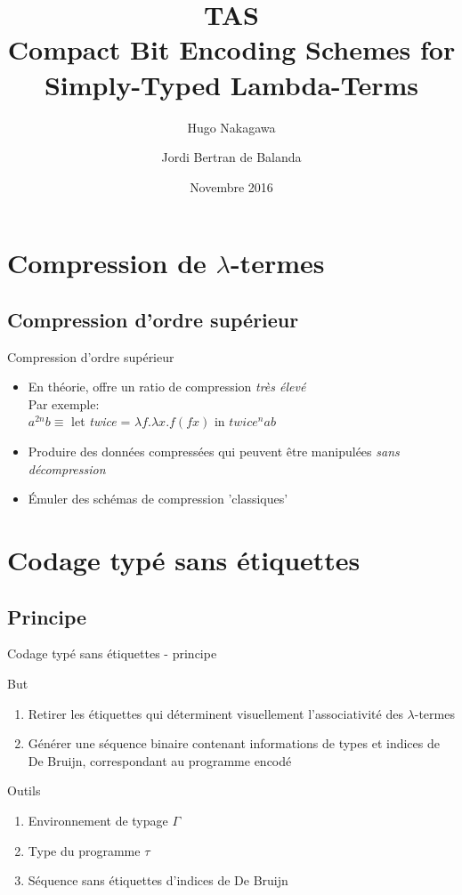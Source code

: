 \documentclass{beamer}
\title{TAS \\ Compact Bit Encoding Schemes for Simply-Typed Lambda-Terms}
\author{Hugo Nakagawa \and Jordi Bertran de Balanda}
\date{Novembre 2016}
\begin{document}
\begin{frame}
  \titlepage
\end{frame}

\begin{frame}
  \tableofcontents
\end{frame}

\section{Compression de $\lambda$-termes}

\subsection{Compression d'ordre supérieur}
\begin{frame}{Compression d'ordre supérieur}
  \begin{itemize}
  \item
    En théorie, offre un ratio de compression \emph{très élevé} \\
    Par exemple: \\
    $a^{2n}b \equiv$ let \emph{twice} = $\lambda f.\lambda x.f(fx)$ in $twice^n a b$
  \item Produire des données compressées qui peuvent être manipulées \emph{sans décompression}
  \item Émuler des schémas de compression 'classiques'
  \end{itemize}
\end{frame}

\section{Codage typé sans étiquettes}

\subsection{Principe}
\begin{frame}{Codage typé sans étiquettes - principe}
  \begin{block}{But}
    \begin{enumerate}
      \item Retirer les étiquettes qui déterminent visuellement l'associativité des $\lambda$-termes
      \item Générer une séquence binaire contenant informations de types et indices de De Bruijn, correspondant au programme encodé
    \end{enumerate}
  \end{block}
  \pause
  \begin{block}{Outils}
    \begin{enumerate}
      \item Environnement de typage $\Gamma$
      \item Type du programme $\tau$
      \item Séquence sans étiquettes d'indices de De Bruijn
    \end{enumerate}
  \end{block}

\end{frame}
\end{document}
